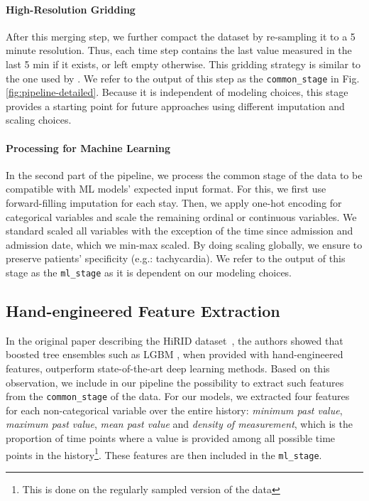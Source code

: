 \documentclass{article}
\begin{document}
\paragraph{High-Resolution Gridding} After this merging step, we further compact the dataset by re-sampling it to a 5 minute resolution. Thus, each time step contains the last value measured in the last 5 min if it exists, or left empty otherwise. This gridding strategy is similar to the one used by \citep{hyland2020early}. We refer to the output of this step as the \texttt{common\_stage} in Fig.\ref{fig:pipeline-detailed}. Because it is independent of modeling choices, this stage provides a starting point for future approaches using different imputation and scaling choices.

\paragraph{Processing for Machine Learning} In the second part of the pipeline, we process the common stage of the data to be compatible with ML models' expected input format. For this, we first use forward-filling imputation for each stay. Then, we apply one-hot encoding for categorical variables and scale the remaining ordinal or continuous variables. We standard scaled all variables with the exception of the time since admission and admission date, which we min-max scaled. By doing scaling globally, we ensure to preserve patients' specificity (e.g.: tachycardia). We refer to the output of this stage as the \texttt{ml\_stage} as it is dependent on our modeling choices.

\subsection{Hand-engineered Feature Extraction}
In the original paper describing the HiRID dataset~\citep{hyland2020early}, the authors showed that boosted tree ensembles such as LGBM \citep{ke2017lightgbm}, when provided with hand-engineered features, outperform state-of-the-art deep learning methods. Based on this observation, we include in our pipeline the possibility to extract such features from the \texttt{common\_stage} of the data. For our models, we extracted four features for each non-categorical variable over the entire history: \textit{minimum past value}, \textit{maximum past value}, \textit{mean past value} and \textit{density of measurement}, which is the proportion of time points where a value is provided among all possible time points in the history\footnote{This is done on the regularly sampled version of the data}. These features are then included in the \texttt{ml\_stage}.
\end{document}
